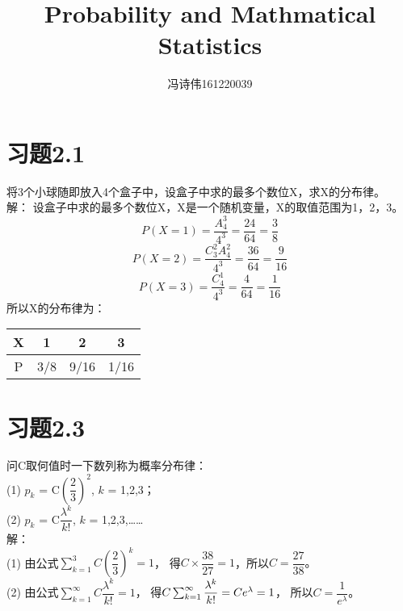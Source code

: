 \documentclass[a4papers]{ctexart}
\title{Probability and Mathmatical Statistics}
\author{冯诗伟161220039}
\date{}
\begin{document}
\maketitle
\section{习题2.1}
将3个小球随即放入4个盒子中，设盒子中求的最多个数位X，求X的分布律。\\
\noindent 解：
\indent 设盒子中求的最多个数位X，X是一个随机变量，X的取值范围为1，2，3。\\
\[ P(X=1) = \frac{A_4^3}{4^3}=\frac{24}{64}=\frac{3}{8} \]
\[ P(X=2) =\frac{C_3^2 A_4^2}{4^3} = \frac{36}{64}=\frac{9}{16} \]
\[P(X=3) = \frac{C_4^1}{4^3} = \frac{4}{64}=\frac{1}{16} \]
所以X的分布律为：\\
\begin{center}
\begin{tabular}{c|ccc}
X & 1 & 2 & 3 \\
\hline
P & 3/8 & 9/16 & 1/16
\end{tabular}
\end{center}

\section{习题2.3}
问C取何值时一下数列称为概率分布律：\\
(1) $p_k$ = C$\left( \dfrac{2}{3} \right)^2$, $k$ = 1,2,3；\\
(2) $p_k$ = C$\dfrac{\lambda^k}{k!}$, $k$ = 1,2,3,…… \\
\noindent 解：\\
(1) 由公式$\sum_{k=1}^3 C\left(\dfrac{2}{3}\right)^k = 1$，
得$C\times\dfrac{38}{27} = 1$，所以$C = \dfrac{27}{38}。$\\
(2) 由公式$\sum_{k=1}^\infty C\dfrac{\lambda^k}{k!} = 1$，
得$C\sum_{k=1}^\infty \dfrac{\lambda^k}{k!} = C\*e^\lambda = 1$，
所以$C = \dfrac{1}{e^\lambda}$。\\
\end{document}
